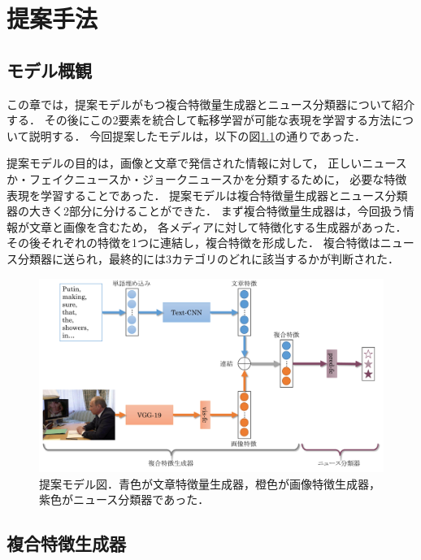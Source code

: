%
\chapter{提案手法}
%
\section{モデル概観}
この章では，提案モデルがもつ複合特徴量生成器とニュース分類器について紹介する．
その後にこの2要素を統合して転移学習が可能な表現を学習する方法について説明する．
今回提案したモデルは，以下の図\ref{fig:model}の通りであった．

提案モデルの目的は，画像と文章で発信された情報に対して，
正しいニュースか・フェイクニュースか・ジョークニュースかを分類するために，
必要な特徴表現を学習することであった．
提案モデルは複合特徴量生成器とニュース分類器の大きく2部分に分けることができた．
まず複合特徴量生成器は，今回扱う情報が文章と画像を含むため，
各メディアに対して特徴化する生成器があった．
その後それぞれの特徴を1つに連結し，複合特徴を形成した．
複合特徴はニュース分類器に送られ，最終的には3カテゴリのどれに該当するかが判断された．
% 
\begin{figure}[H]
    \centering
    \includegraphics[width=\linewidth]{images/methodology.pdf}
    \caption{提案モデル図．青色が文章特徴量生成器，橙色が画像特徴生成器，紫色がニュース分類器であった．}
    \label{fig:model}
\end{figure}
%
\section{複合特徴生成器}
%
